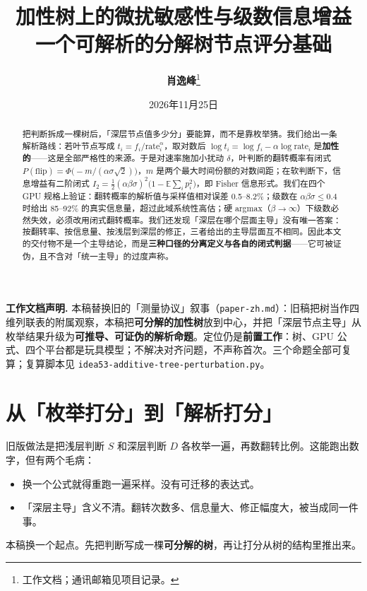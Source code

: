 \documentclass[12pt]{ctexart}
\title{\textbf{加性树上的微扰敏感性与级数信息增益}\\[4pt]\large 一个可解析的分解树节点评分基础}
\author{\textbf{肖逸峰}\thanks{工作文档；通讯邮箱见项目记录。}}
\date{2026年11月25日}
\newcommand{\E}{\mathbb{E}}
\newcommand{\rate}{\mathrm{rate}}
\newcommand{\flip}{\mathrm{flip}}
\begin{document}
\maketitle

\noindent\textbf{工作文档声明.} 本稿替换旧的「测量协议」叙事（\texttt{paper-zh.md}）：旧稿把树当作四维列联表的附属观察，本稿把\textbf{可分解的加性树}放到中心，并把「深层节点主导」从枚举结果升级为\textbf{可推导、可证伪的解析命题}。定位仍是\textbf{前置工作}：树、GPU 公式、四个平台都是玩具模型；不解决对齐问题，不声称首次。三个命题全部可复算；复算脚本见 \texttt{idea53-additive-tree-\allowbreak perturbation.py}。

\begin{abstract}
把判断拆成一棵树后，「深层节点值多少分」要能算，而不是靠枚举猜。我们给出一条解析路线：若叶节点写成 $t_i=f_i/\rate_i^{\alpha}$，取对数后 $\log t_i=\log f_i-\alpha\log\rate_i$ 是\textbf{加性的}——这是全部严格性的来源。于是对速率施加小扰动 $\delta$，叶判断的翻转概率有闭式 $P(\flip)=\Phi\!\big(-m/(\alpha\sigma\sqrt2)\big)$，$m$ 是两个最大时间份额的对数间距；在软判断下，信息增益有二阶闭式 $I_2=\tfrac12(\alpha\beta\sigma)^2\big(1-\E\sum_i p_i^2\big)$，即 Fisher 信息形式。我们在四个 GPU 规格上验证：翻转概率的解析值与采样值相对误差 0.5--8.2\%；级数在 $\alpha\beta\sigma\le0.4$ 时给出 85--92\% 的真实信息量，超过此域系统性高估；硬 argmax（$\beta\to\infty$）下级数必然失效，必须改用闭式翻转概率。我们还发现「深层在哪个层面主导」没有唯一答案：按翻转率、按信息量、按浅层到深层的修正，三者给出的主导层面互不相同。因此本文的交付物不是一个主导结论，而是\textbf{三种口径的分离定义与各自的闭式判据}——它可被证伪，且不含对「统一主导」的过度声称。
\end{abstract}

\section{从「枚举打分」到「解析打分」}

旧版做法是把浅层判断 $S$ 和深层判断 $D$ 各枚举一遍，再数翻转比例。这能跑出数字，但有两个毛病：

\begin{itemize}
  \item 换一个公式就得重跑一遍采样。没有可迁移的表达式。
  \item 「深层主导」含义不清。翻转次数多、信息量大、修正幅度大，被当成同一件事。
\end{itemize}

本稿换一个起点。先把判断写成一棵\textbf{可分解的树}，再让打分从树的结构里推出来。
\end{document}
